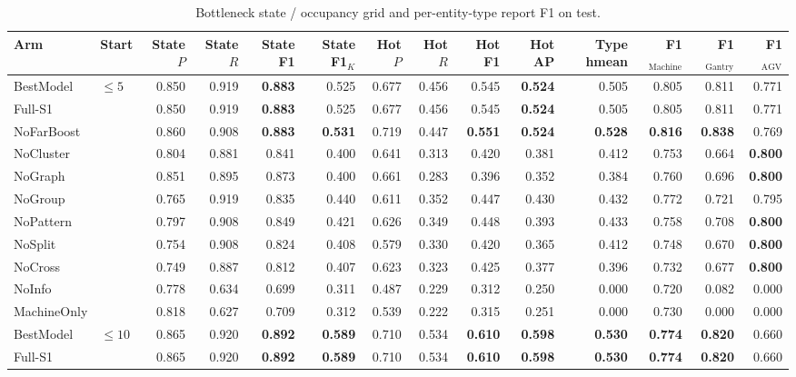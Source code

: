 \documentclass[9pt,a4paper,twocolumn]{extarticle}
\begin{document}
\begin{table}[tp]
\centering\scriptsize\setlength{\tabcolsep}{3.2pt}
\caption{Bottleneck state / occupancy grid and per-entity-type report F1 on test.}
\begin{tabular}{llrrrrrrrrrrrr}
\toprule
Arm & Start & State $P$ & State $R$ & State F1 & State F1$_K$ & Hot $P$ & Hot $R$ & Hot F1 & Hot AP & Type hmean & F1$_{\mathrm{Machine}}$ & F1$_{\mathrm{Gantry}}$ & F1$_{\mathrm{AGV}}$ \\
\midrule
BestModel & $\le 5$ & 0.850 & 0.919 & \textbf{0.883} & 0.525 & 0.677 & 0.456 & 0.545 & \textbf{0.524} & 0.505 & 0.805 & 0.811 & 0.771 \\
Full-S1 &  & 0.850 & 0.919 & \textbf{0.883} & 0.525 & 0.677 & 0.456 & 0.545 & \textbf{0.524} & 0.505 & 0.805 & 0.811 & 0.771 \\
NoFarBoost &  & 0.860 & 0.908 & \textbf{0.883} & \textbf{0.531} & 0.719 & 0.447 & \textbf{0.551} & \textbf{0.524} & \textbf{0.528} & \textbf{0.816} & \textbf{0.838} & 0.769 \\
NoCluster &  & 0.804 & 0.881 & 0.841 & 0.400 & 0.641 & 0.313 & 0.420 & 0.381 & 0.412 & 0.753 & 0.664 & \textbf{0.800} \\
NoGraph &  & 0.851 & 0.895 & 0.873 & 0.400 & 0.661 & 0.283 & 0.396 & 0.352 & 0.384 & 0.760 & 0.696 & \textbf{0.800} \\
NoGroup &  & 0.765 & 0.919 & 0.835 & 0.440 & 0.611 & 0.352 & 0.447 & 0.430 & 0.432 & 0.772 & 0.721 & 0.795 \\
NoPattern &  & 0.797 & 0.908 & 0.849 & 0.421 & 0.626 & 0.349 & 0.448 & 0.393 & 0.433 & 0.758 & 0.708 & \textbf{0.800} \\
NoSplit &  & 0.754 & 0.908 & 0.824 & 0.408 & 0.579 & 0.330 & 0.420 & 0.365 & 0.412 & 0.748 & 0.670 & \textbf{0.800} \\
NoCross &  & 0.749 & 0.887 & 0.812 & 0.407 & 0.623 & 0.323 & 0.425 & 0.377 & 0.396 & 0.732 & 0.677 & \textbf{0.800} \\
NoInfo &  & 0.778 & 0.634 & 0.699 & 0.311 & 0.487 & 0.229 & 0.312 & 0.250 & 0.000 & 0.720 & 0.082 & 0.000 \\
MachineOnly &  & 0.818 & 0.627 & 0.709 & 0.312 & 0.539 & 0.222 & 0.315 & 0.251 & 0.000 & 0.730 & 0.000 & 0.000 \\
\midrule
BestModel & $\le 10$ & 0.865 & 0.920 & \textbf{0.892} & \textbf{0.589} & 0.710 & 0.534 & \textbf{0.610} & \textbf{0.598} & \textbf{0.530} & \textbf{0.774} & \textbf{0.820} & 0.660 \\
Full-S1 &  & 0.865 & 0.920 & \textbf{0.892} & \textbf{0.589} & 0.710 & 0.534 & \textbf{0.610} & \textbf{0.598} & \textbf{0.530} & \textbf{0.774} & \textbf{0.820} & 0.660 \\

\end{tabular}
\end{table}
\end{document}
